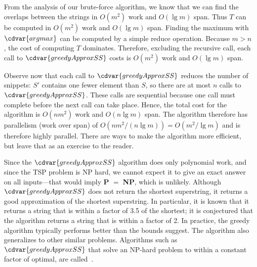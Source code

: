 \begin{gram}
From the analysis of our brute-force algorithm, we know that we can
find the overlaps between the strings in $O(m^2)$ work and $O(\lg{m})$
span.
%
Thus $T$ can be computed in $O(m^2)$ work and $O(\lg{m})$ span.
%
Finding the maximum with $\cdvar{argmax}$ can be computed by a simple reduce operation.
%
Because $m > n$, the cost of computing $T$ dominates. 
%
Therefore, excluding the recursive
call, each call to $\cdvar{greedyApproxSS}$ costs is $O(m^2)$ work and
$O(\lg{m})$ span.

Observe now that each call to $\cdvar{greedyApproxSS}$ reduces the
number of snippets: $S'$ contains one fewer element than $S$, so
there are at most $n$ calls to $\cdvar{greedyApproxSS}$.  
%
These calls are sequential because one call must complete before the
next call can take place.  
%
Hence, the total cost for the algorithm is $O(n m^2)$ work and $O(n
\lg m)$ span.  
%
The algorithm therefore has parallelism (work over span) of $O(n m^2 / (n \lg m)) = O(m^2
/ \lg m)$ and is therefore highly parallel.
%
There are ways to make the algorithm more efficient, but leave that as
an exercise to the reader.
\end{gram}

\begin{gram}
Since the $\cdvar{greedyApproxSS}$ algorithm does only polynomial work,
and since the TSP problem is NP hard, we cannot expect it to give an
exact answer on all inputs---that would imply \textbf{P} $=$
\textbf{NP}, which is unlikely.
%
Although $\cdvar{greedyApproxSS}$ does not return the shortest
superstring, it returns a good approximation of the shortest
superstring.
%
In particular, it is known that it returns a string that is within a
factor of 3.5 of the shortest; it is conjectured that the algorithm
returns a string that is within a factor of 2.  
%
In practice, the greedy algorithm typically performs better than the
bounds suggest.  The algorithm also generalizes to other similar
problems.
%
Algorithms such as $\cdvar{greedyApproxSS}$ that solve an NP-hard problem
to within a constant factor of optimal, are
called~.
%
\end{gram}



